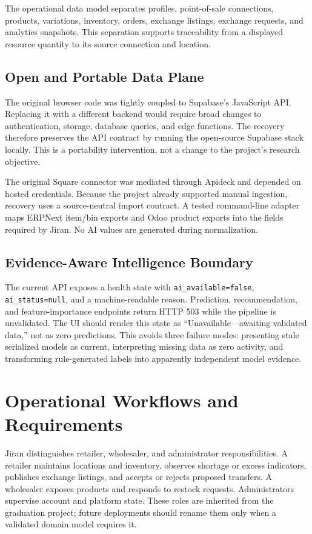 \documentclass[graybox]{svmult}
\begin{document}
The operational data model separates profiles, point-of-sale connections, products, variations, inventory, orders, exchange listings, exchange requests, and analytics snapshots. This separation supports traceability from a displayed resource quantity to its source connection and location.

\subsection{Open and Portable Data Plane}
The original browser code was tightly coupled to Supabase's JavaScript API. Replacing it with a different backend would require broad changes to authentication, storage, database queries, and edge functions. The recovery therefore preserves the API contract by running the open-source Supabase stack locally. This is a portability intervention, not a change to the project's research objective.

The original Square connector was mediated through Apideck and depended on hosted credentials. Because the project already supported manual ingestion, recovery uses a source-neutral import contract. A tested command-line adapter maps ERPNext item/bin exports and Odoo product exports into the fields required by Jiran. No AI values are generated during normalization.

\subsection{Evidence-Aware Intelligence Boundary}
The current API exposes a health state with \texttt{ai\_available=false}, \texttt{ai\_status=null}, and a machine-readable reason. Prediction, recommendation, and feature-importance endpoints return HTTP 503 while the pipeline is unvalidated. The UI should render this state as ``Unavailable---awaiting validated data,'' not as zero predictions. This avoids three failure modes: presenting stale serialized models as current, interpreting missing data as zero activity, and transforming rule-generated labels into apparently independent model evidence.

\section{Operational Workflows and Requirements}
Jiran distinguishes retailer, wholesaler, and administrator responsibilities. A retailer maintains locations and inventory, observes shortage or excess indicators, publishes exchange listings, and accepts or rejects proposed transfers. A wholesaler exposes products and responds to restock requests. Administrators supervise account and platform state. These roles are inherited from the graduation project; future deployments should rename them only when a validated domain model requires it.
\end{document}
